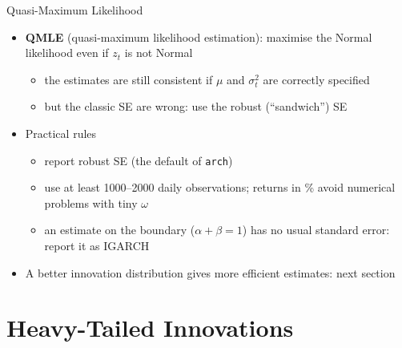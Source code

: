 \begin{frame}{Quasi-Maximum Likelihood}
\itemsize{\small}
\begin{itemize}
    \item \textbf{QMLE} (quasi-maximum likelihood estimation): maximise the Normal likelihood even if $z_t$ is not Normal
    \begin{itemize}
        \item the estimates are still consistent if $\mu$ and $\sigma_t^2$ are correctly specified 
        \item but the classic SE are wrong: use the robust (``sandwich'') SE
    \end{itemize}
    \item Practical rules
    \begin{itemize}
        \item report robust SE (the default of \texttt{arch})
        \item use at least 1000--2000 daily observations; returns in \% avoid numerical problems with tiny $\omega$
        \item an estimate on the boundary ($\alpha + \beta = 1$) has no usual standard error: report it as IGARCH
    \end{itemize}
    \item A better innovation distribution gives more efficient estimates: next section
\end{itemize}
\end{frame}


\section{Heavy-Tailed Innovations}

